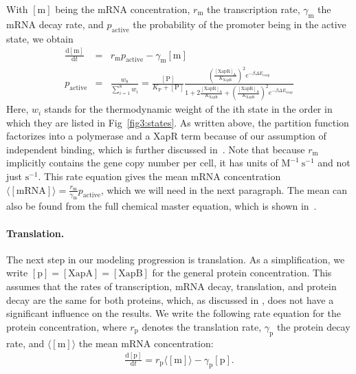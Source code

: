 \documentclass[10pt,letterpaper]{article}
\newcommand{\n}[1]{\mathrm{#1}}
\newcommand{\dd}[2]{\frac{\mathrm{d} #1}{\mathrm{d} #2}}
\begin{document}
	With $\n{[m]}$ being the mRNA concentration, $r_{\n{m}}$ the transcription
	rate, $\gamma_{\n{m}}$ the mRNA decay rate, and $p_{\n{active}}$ the
	probability of the promoter being in the active state, we obtain
	\begin{eqnarray}
	\label{eq:mbasic}
	\dd{\n{[m]}}{t} &=& r_{\n{m}} p_{\n{active}} - \gamma_{\n{m}} \n{[m]} \\
	p_{\n{active}} &=& \frac{w_8}{\sum_{i=1}^{8} w_i} = 
	\frac{\n{[P]}}{K_{\n{P}}+\n{[P]}} 
	\frac{
		\left( \frac{\mathrm{[XapR]_A}}{K_{\mathrm{XapR}}} \right)^2 
		e^{- \beta \Delta E_{\n{coop}}}
	}{
		1 + 
		2 \frac{\mathrm{[XapR]_A}}{K_{\mathrm{XapR}}} +
		\left( \frac{\mathrm{[XapR]_A}}{K_{\mathrm{XapR}}} \right)^2 e^{- \beta \Delta E_{\n{coop}}}
	}
	\end{eqnarray}
	Here, $w_i$ stands for the thermodynamic weight of the ith state in the
	order in which they are listed in Fig~\ref{fig3:states}. As written above,
	the partition function factorizes into a polymerase and a XapR term because
	of our assumption of independent binding, which is further discussed
	in~. Note that because $r_{\n{m}}$ implicitly contains the
	gene copy number per cell, it has units of $\n{M^{-1} \ s^{-1}}$ and not
	just $\n{s^{-1}}$. This rate equation gives the mean mRNA concentration
	$\langle\n{[mRNA]}\rangle = \frac{r_{\n{m}}}{\gamma_{\n{m}}}
	p_{\n{active}}$, which we will need in the next paragraph. The mean can also be found from the full chemical master equation, which is shown in~.
	
	\paragraph*{Translation.} 
	The next step in our modeling progression is translation. As a
	simplification, we write $\n{[p]}=\n{[XapA]=[XapB]}$ for the general protein
	concentration. This assumes that the rates of transcription, mRNA decay,
	translation, and protein decay are the same for both proteins, which, as
	discussed in , does not have a significant influence on the
	results. We write the following rate equation for the protein concentration,
	where $r_{\n{p}}$ denotes the translation rate, $\gamma_{\n{p}}$ the protein
	decay rate, and $\langle \n{[m]} \rangle$ the mean mRNA concentration:
	\begin{eqnarray}
	\label{eq:pbasic}
	\dd{\n{[p]}}{t} = r_{\n{p}} \langle \n{[m]} \rangle - \gamma_{\n{p}} \n{[p]}.
	\end{eqnarray}
	
\end{document}
